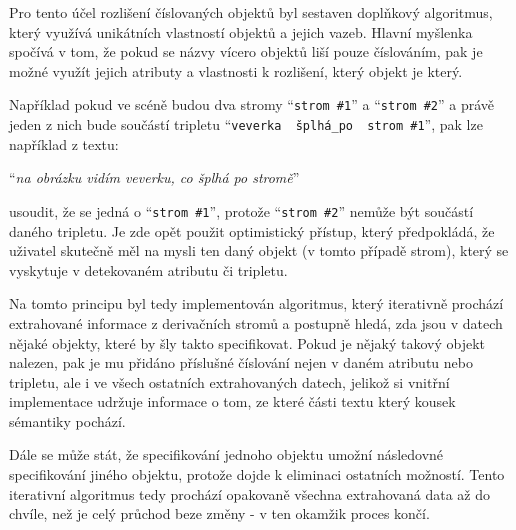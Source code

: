 Pro tento účel rozlišení číslovaných objektů byl sestaven doplňkový algoritmus,
který využívá unikátních vlastností objektů a jejich vazeb.
Hlavní myšlenka spočívá v tom, že pokud se názvy vícero objektů liší pouze číslováním,
pak je možné využít jejich atributy a vlastnosti k rozlišení, který objekt je který.

Například pokud ve scéně budou dva stromy \enquote{\texttt{strom \#1}} a \enquote{\texttt{strom \#2}} a právě jeden z nich
bude součástí tripletu \enquote{\texttt{veverka \to\ šplhá\_po \to\ strom \#1}}, pak lze například z textu:
\begin{center}
	\enquote{\emph{na obrázku vidím veverku, co šplhá po stromě}}
\end{center}
usoudit, že se jedná o \enquote{\texttt{strom \#1}}, protože \enquote{\texttt{strom \#2}} nemůže být součástí daného tripletu.
Je zde opět použit optimistický přístup, který předpokládá, že uživatel skutečně měl na mysli ten daný objekt (v tomto případě strom),
který se vyskytuje v detekovaném atributu či tripletu.

Na tomto principu byl tedy implementován algoritmus, který iterativně prochází extrahované informace z derivačních stromů
a postupně hledá, zda jsou v datech nějaké objekty, které by šly takto specifikovat.
Pokud je nějaký takový objekt nalezen, pak je mu přidáno příslušné číslování nejen v daném atributu nebo tripletu,
ale i ve všech ostatních extrahovaných datech, jelikož si vnitřní implementace udržuje informace o tom,
ze které části textu který kousek sémantiky pochází.

Dále se může stát, že specifikování jednoho objektu umožní následovné specifikování jiného objektu, protože dojde k eliminaci ostatních možností.
Tento iterativní algoritmus tedy prochází opakovaně všechna extrahovaná data až do chvíle,
než je celý průchod beze změny - v ten okamžik proces končí.
